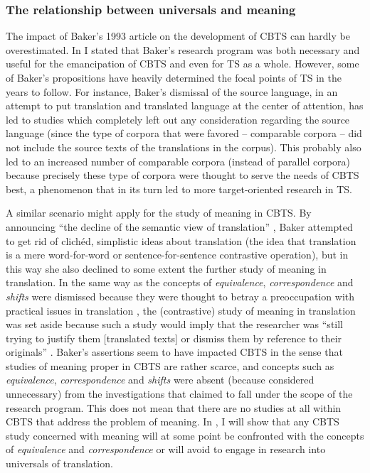 \subsubsection{The relationship between universals and meaning}
\label{sec:2.2.2.6}  
The impact of Baker’s 1993 article on the development of CBTS can hardly be overestimated. In  I stated that Baker’s research program was both necessary and useful for the emancipation of CBTS and even for TS as a whole. However, some of Baker’s propositions have heavily determined the focal points of TS in the years to follow. For instance, Baker’s dismissal of the source language, in an attempt to put translation and translated language at the center of attention, has led to studies which completely left out any consideration regarding the source language (since the type of corpora that were favored – comparable corpora – did not include the source texts of the translations in the corpus). This probably also led to an increased number of comparable corpora (instead of parallel corpora) because precisely these type of corpora were thought to serve the needs of CBTS best, a phenomenon that in its turn led to more target-oriented research in TS.

A similar scenario might apply for the study of meaning in CBTS. By announcing “the decline of the semantic view of translation” \citep[237]{baker_corpus_1993}, Baker attempted to get rid of clichéd, simplistic ideas about translation (the idea that translation is a mere word-for-word or sentence-for-sentence contrastive operation), but in this way she also declined to some extent the further study of meaning in translation. In the same way as the concepts of \textit{equivalence}, \textit{correspondence} and \textit{shifts} were dismissed because they were thought to betray a preoccupation with practical issues in translation \citep[235]{baker_corpus_1993}, the (contrastive) study of meaning in translation was set aside because such a study would imply that the researcher was “still trying to justify them [translated texts] or dismiss them by reference to their originals” \citep[235]{baker_corpus_1993}. Baker’s assertions seem to have impacted CBTS in the sense that studies of meaning proper in CBTS are rather scarce, and concepts such as \textit{equivalence}, \textit{correspondence} and \textit{shifts} were absent (because considered unnecessary) from the investigations that claimed to fall under the scope of the research program. This does not mean that there are no studies at all within CBTS that address the problem of meaning. In , I will show that any CBTS study concerned with meaning will at some point be confronted with the concepts of \textit{equivalence} and \textit{correspondence} or will avoid to engage in research into universals of translation.


